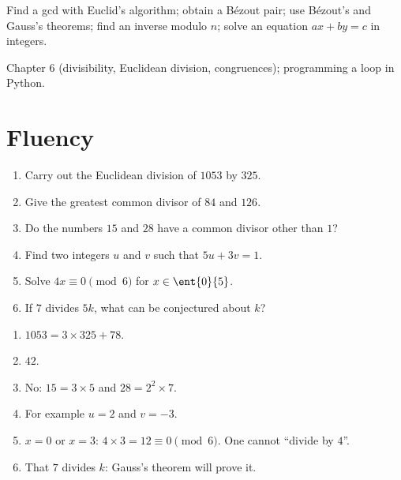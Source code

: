 
\begin{objectives}
Find a gcd with Euclid's algorithm; obtain a Bézout pair; use Bézout's and Gauss's theorems; find an inverse modulo $n$; solve an equation $ax+by=c$ in integers.
\end{objectives}
\begin{prerequisites}
Chapter 6 (divisibility, Euclidean division, congruences); programming a loop in Python.
\end{prerequisites}

\section{Fluency}
\begin{fluency}
\begin{enumerate}
\item Carry out the Euclidean division of $\num{1053}$ by $325$.
\item Give the greatest common divisor of $84$ and $126$.
\item Do the numbers $15$ and $28$ have a common divisor other than $1$?
\item Find two integers $u$ and $v$ such that $5u+3v=1$.
\item Solve $4x\equiv0\pmod{6}$ for $x\in\ent{0}{5}$.
\item If $7$ divides $5k$, what can be conjectured about $k$?
\end{enumerate}
\end{fluency}
\begin{solution}[Fluency]
\begin{enumerate}
\item $\num{1053}=3\times325+78$.
\item $42$.
\item No: $15=3\times5$ and $28=2^2\times7$.
\item For example $u=2$ and $v=-3$.
\item $x=0$ or $x=3$: $4\times3=12\equiv0\pmod6$. One cannot ``divide by $4$''.
\item That $7$ divides $k$: Gauss's theorem will prove it.
\end{enumerate}
\end{solution}

\mxnewpage
